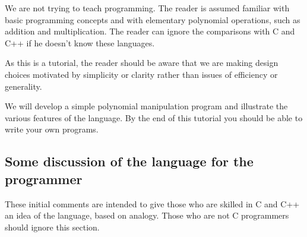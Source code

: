 We are not trying to teach programming. The reader is assumed familiar
with basic programming concepts and with elementary polynomial
operations, such as addition and multiplication.
The reader can ignore the comparisons with C and C++ if he
doesn't know these languages.

As this is a tutorial, the reader should be aware that we are making
design choices motivated by simplicity or
clarity rather than issues of efficiency or generality.



We will develop a simple polynomial manipulation program and
illustrate the various features of the language. By the end of
this tutorial you should be able to write your own \asharp{} programs.

\subsection{Some discussion of the \asharp{} language for the programmer}

These initial comments are intended to give those who are skilled in C
and C++ an idea of the \asharp{} language, based on analogy. Those who
are not C programmers should ignore this section.

